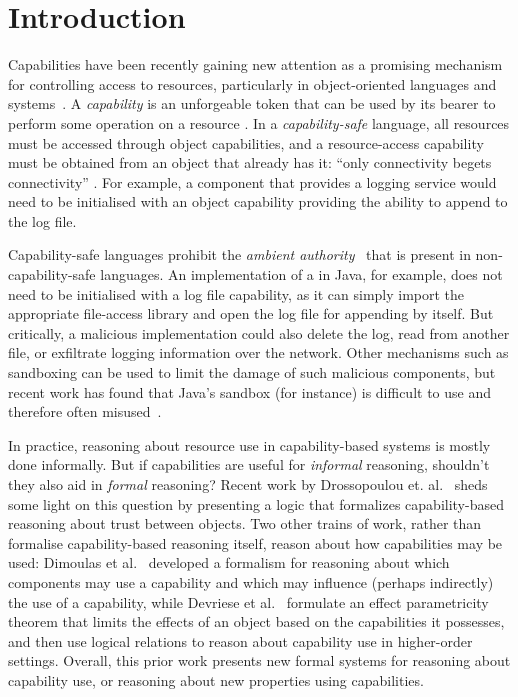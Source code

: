 \section{Introduction}

Capabilities have been recently gaining new attention as a promising
mechanism for controlling access to resources, particularly in
object-oriented languages and
systems~\cite{miller03,drossopoulou07,dimoulas14,devriese16}.  A
\textit{capability} is an unforgeable token that can be used by its
bearer to perform some operation on a resource \cite{dennis66}.  In a
\textit{capability-safe} language, all resources must be accessed
through object capabilities, and a resource-access capability must be
obtained from an object that already has it: ``only connectivity
begets connectivity'' \cite{miller03}.  For example, a 
component that provides a logging service would need to be initialised
with an object capability providing the ability to append to the log
file.

Capability-safe languages prohibit the \textit{ambient
  authority}~\cite{miller06} that is present in non-capability-safe
languages. An implementation of a  in Java, for example,
does not need to be initialised with a log file capability, as it can simply
import the appropriate file-access library and open the log file for
appending by itself. But critically, a malicious implementation could also
delete the log, read from another file, or exfiltrate logging information
over the network.  Other mechanisms such as sandboxing can be used
to limit the damage of such malicious components, but recent work has
found that Java's sandbox (for instance) is difficult to use and
therefore often misused~\cite{coker15,maass16}.

In practice, reasoning about resource use in capability-based systems
is mostly done informally.
But if capabilities are useful for \textit{informal} reasoning,
shouldn't they also aid in \textit{formal} reasoning?  Recent work by
Drossopoulou et. al.~\cite{drossopoulou07} sheds some light on this question
by presenting a logic that 
formalizes capability-based reasoning about trust between
objects.  Two other trains of work, rather than
formalise capability-based reasoning itself, reason about how
capabilities may be used: Dimoulas et al.~\cite{dimoulas14} developed a formalism for
reasoning about which components may use a capability and which may
influence (perhaps indirectly) the use of a
capability, while  Devriese et al.~\cite{devriese16} formulate an effect
parametricity theorem that limits the effects of an object based on
the capabilities it possesses, and then use logical relations to
reason about capability use in higher-order settings.  Overall, this prior work presents new formal systems for reasoning
about capability use, or reasoning about new properties using
capabilities.

